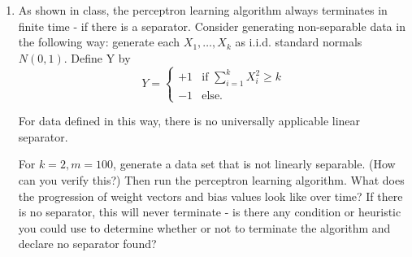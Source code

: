 \documentclass[letter, 12pt]{article}
\begin{document}
\begin{enumerate}
        \item {As shown in class, the perceptron learning algorithm always terminates in finite time - if there is a separator.
            Consider generating non-separable data in the following way: generate each $ X_1 , \dots , X_k $ as i.i.d. standard
            normals $ N (0, 1) $. Define Y by \[ Y = \begin{cases}
            +1 & \text{if } \sum_{i=1}^{k}X_i^2 \ge k \\
            -1 & \text{else}.
            \end{cases} \]}
        \par{For data defined in this way, there is no universally applicable linear separator.}
        \par{For $ k = 2, m = 100 $, generate a data set that is not linearly separable. (How can you verify this?) Then run
            the perceptron learning algorithm. What does the progression of weight vectors and bias values look like over
            time? If there is no separator, this will never terminate - is there any condition or heuristic you could use to
            determine whether or not to terminate the algorithm and declare no separator found?}
    \end{enumerate}
\end{document}
